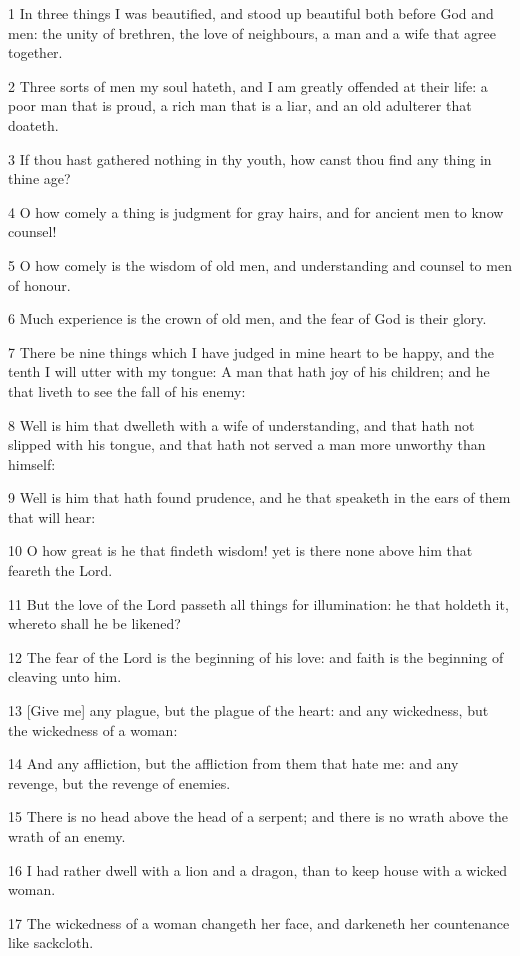 \par 1 In three things I was beautified, and stood up beautiful both before God and men: the unity of brethren, the love of neighbours, a man and a wife that agree together.
\par 2 Three sorts of men my soul hateth, and I am greatly offended at their life: a poor man that is proud, a rich man that is a liar, and an old adulterer that doateth.
\par 3 If thou hast gathered nothing in thy youth, how canst thou find any thing in thine age?
\par 4 O how comely a thing is judgment for gray hairs, and for ancient men to know counsel!
\par 5 O how comely is the wisdom of old men, and understanding and counsel to men of honour.
\par 6 Much experience is the crown of old men, and the fear of God is their glory.
\par 7 There be nine things which I have judged in mine heart to be happy, and the tenth I will utter with my tongue: A man that hath joy of his children; and he that liveth to see the fall of his enemy:
\par 8 Well is him that dwelleth with a wife of understanding, and that hath not slipped with his tongue, and that hath not served a man more unworthy than himself:
\par 9 Well is him that hath found prudence, and he that speaketh in the ears of them that will hear:
\par 10 O how great is he that findeth wisdom! yet is there none above him that feareth the Lord.
\par 11 But the love of the Lord passeth all things for illumination: he that holdeth it, whereto shall he be likened?
\par 12 The fear of the Lord is the beginning of his love: and faith is the beginning of cleaving unto him.
\par 13 [Give me] any plague, but the plague of the heart: and any wickedness, but the wickedness of a woman:
\par 14 And any affliction, but the affliction from them that hate me: and any revenge, but the revenge of enemies.
\par 15 There is no head above the head of a serpent; and there is no wrath above the wrath of an enemy.
\par 16 I had rather dwell with a lion and a dragon, than to keep house with a wicked woman.
\par 17 The wickedness of a woman changeth her face, and darkeneth her countenance like sackcloth.

